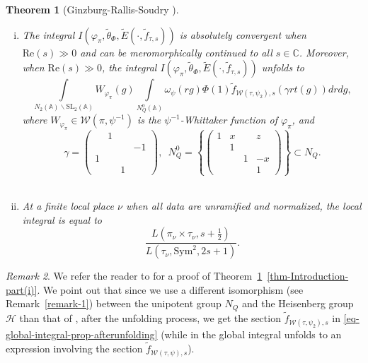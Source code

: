 \documentclass[11pt]{amsart}
\newtheorem{theorem}{Theorem}[section]
\theoremstyle{definition}
\theoremstyle{remark}
\newtheorem{remark}[theorem]{Remark}
\begin{document}
\begin{theorem}[Ginzburg-Rallis-Soudry \cite{GinzburgRallisSoudry1998}]
\leavevmode
\begin{enumerate}[(i)]
    \item The integral $I(\varphi_\pi,  \widetilde{\theta}_{\Phi},\widetilde{E}(\cdot, \tilde{f}_{\tau, s}))$ is absolutely convergent when $\mathrm{Re}(s)\gg 0$ and can be meromorphically continued to all $s\in \mathbb{C}$. Moreover, when $\mathrm{Re}(s) \gg 0$, the integral $I(\varphi_\pi,  \widetilde{\theta}_{\Phi},\widetilde{E}(\cdot, \tilde{f}_{\tau, s})) $ unfolds to 
    \begin{equation}
    \int\limits_{N_2(\mathbb{A})\backslash \mathrm{SL}_2(\mathbb{A})}   W_{\varphi_\pi}(g)   \int\limits_{N_Q^0(\mathbb{A})} \omega_\psi(rg)\Phi(1) \tilde{f}_{\mathcal{W}(\tau,\psi_2), s}  \left( \gamma r t(g)  \right) dr dg,
    \label{eq-global-integral-prop-afterunfolding}
    \end{equation}
    where $W_{\varphi_\pi}\in \mathcal{W}(\pi, \psi^{-1})$ is the $\psi^{-1}$-Whittaker function of $\varphi_\pi$, and
    \begin{equation*}
    \gamma=\left(\begin{smallmatrix} & 1 &&\\ &&&-1\\1&&&\\&&1& \end{smallmatrix}\right), \, \, \, N_Q^0=\left\{ \left(\begin{smallmatrix} 1 & x &  & z\\ &1 & &\\ &&1&-x\\&&&1 \end{smallmatrix} \right)\right\}\subset N_Q.
    \end{equation*}
    \label{thm-Introduction-part(i)}\\
    
    \item At a finite local place $\nu$ when all data are unramified and normalized, the local integral is equal to 
\begin{equation*}
 \frac{L(\pi_\nu\times \tau_\nu, s+\frac{1}{2})}{L(\tau_\nu, \mathrm{Sym}^2, 2s+1)} .
\end{equation*}\label{thm-Introduction-part(ii)}
\end{enumerate}
\label{thm-Introduction}
\end{theorem}

\begin{remark}
We refer the reader to \cite[Theorem 5.1]{GinzburgRallisSoudry1998} for a proof of Theorem~\ref{thm-Introduction}~\ref{thm-Introduction-part(i)}. We point out that since we use a different isomorphism (see Remark~\ref{remark-1}) between the unipotent group $N_Q$ and the Heisenberg group $\mathcal{H}$ than that of \cite{GinzburgRallisSoudry1998}, after the unfolding process, we get the section $\tilde{f}_{\mathcal{W}(\tau,\psi_2), s}$ in \eqref{eq-global-integral-prop-afterunfolding} (while in \cite[Theorem 5.1]{GinzburgRallisSoudry1998} the global integral unfolds to an expression involving the section $\tilde{f}_{\mathcal{W}(\tau,\psi), s}$).
\end{remark}
\end{document}
